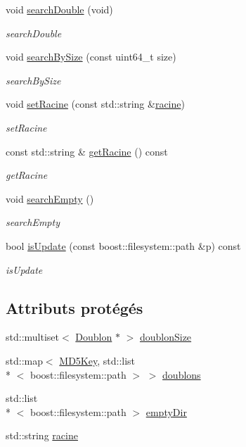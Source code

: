 \begin{DoxyCompactItemize}
void \hyperlink{class_organizer_a12be02528b8c31e9b65d4df997fbe9d7}{search\-Double} (void)
\begin{DoxyCompactList}\small\item\em search\-Double \end{DoxyCompactList}\item 
void \hyperlink{class_organizer_a1addfcdc39e0f88d06dec40ed4c8f3c0}{search\-By\-Size} (const uint64\-\_\-t size)
\begin{DoxyCompactList}\small\item\em search\-By\-Size \end{DoxyCompactList}\item 
void \hyperlink{class_organizer_a02f870946fca1233f00da57344160dad}{set\-Racine} (const std\-::string \&\hyperlink{class_organizer_a2566fc607cc0b35100704973d863b9d2}{racine})
\begin{DoxyCompactList}\small\item\em set\-Racine \end{DoxyCompactList}\item 
const std\-::string \& \hyperlink{class_organizer_a59afde8760b237f962bcf540cd49c028}{get\-Racine} () const 
\begin{DoxyCompactList}\small\item\em get\-Racine \end{DoxyCompactList}\item 
void \hyperlink{class_organizer_ae27eedbd6bdd5aeb2b42c4b90572b8b0}{search\-Empty} ()
\begin{DoxyCompactList}\small\item\em search\-Empty \end{DoxyCompactList}\item 
bool \hyperlink{class_organizer_a197fdab12212f89f461f7a46437e8ccc}{is\-Update} (const boost\-::filesystem\-::path \&p) const 
\begin{DoxyCompactList}\small\item\em is\-Update \end{DoxyCompactList}\end{DoxyCompactItemize}
\subsection*{Attributs protégés}
\begin{DoxyCompactItemize}
\item 
std\-::multiset$<$ \hyperlink{class_doublon}{Doublon} $\ast$ $>$ \hyperlink{class_organizer_a05f940c569835259f6473fb762368e48}{doublon\-Size}
\item 
std\-::map$<$ \hyperlink{class_m_d5_key}{M\-D5\-Key}, std\-::list\\*
$<$ boost\-::filesystem\-::path $>$ $>$ \hyperlink{class_organizer_aeeb5d47d3dc7eedccbfa4b25685e93a5}{doublons}
\item 
std\-::list\\*
$<$ boost\-::filesystem\-::path $>$ \hyperlink{class_organizer_a4b1b739d6b2ed1480f81022da9803c22}{empty\-Dir}
\item 
std\-::string \hyperlink{class_organizer_a2566fc607cc0b35100704973d863b9d2}{racine}
\end{DoxyCompactItemize}


